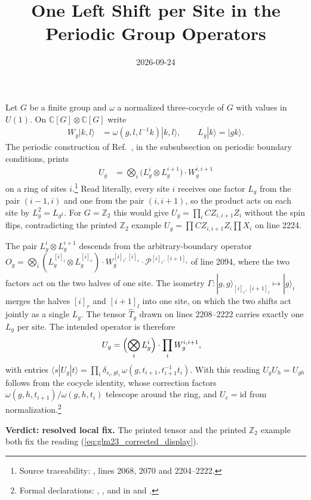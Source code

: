 \documentclass{article}
\title{One Left Shift per Site in the Periodic Group Operators}
\author{}
\date{2026-09-24}
\begin{document}
\maketitle
{}

Let $G$ be a finite group and $\omega$ a normalized three-cocycle of $G$
with values in $U(1)$. On $\mathbb{C}[G]\otimes\mathbb{C}[G]$ write
\begin{align}
    W_g|k,l\rangle
        &=\omega(g,l,l^{-1}k)|k,l\rangle,
    \qquad
    L_g|k\rangle=|gk\rangle .
    \label{eq:glm23_gate_shift}
\end{align}
The periodic construction of Ref.~\cite{GarreRubio2023MPOSym}, in the
subsubsection on periodic boundary conditions, prints
\begin{align}
    U_g
        &=\bigotimes_i \bigl(L_g^{i}\otimes L_g^{i+1}\bigr)\cdot W_g^{i,i+1}
    \label{eq:glm23_printed_display}
\end{align}
on a ring of sites $i$.\footnote{Source traceability:
, lines 2068, 2070 and
2204--2222.}
Read literally, every site $i$ receives one factor $L_g$ from the pair
$(i-1,i)$ and one from the pair $(i,i+1)$, so the product acts on each
site by $L_g^2=L_{g^2}$. For $G=\mathbb{Z}_2$ this would give
$U_g=\prod_i CZ_{i,i+1}Z_i$ without the spin flips, contradicting the
printed $\mathbb{Z}_2$ example $U_g=\prod CZ_{i,i+1}Z_i\prod X_i$ on
line 2224.

The pair $L_g^{i}\otimes L_g^{i+1}$ descends from the arbitrary-boundary
operator
$O_g=\bigotimes_i (L_g^{[i]_l}\otimes L_g^{[i]_r})\cdot
W_g^{[i]_l,[i]_r}\cdot\mathcal{P}^{[i]_r,[i+1]_l}$ of line 2094, where the
two factors act on the two halves of one site. The isometry
$\Gamma:|g,g\rangle_{[i]_r,[i+1]_l}\mapsto|g\rangle_i$ merges the halves
$[i]_r$ and $[i+1]_l$ into one site, on which the two shifts act jointly
as a single $L_g$. The tensor $\hat T_g$ drawn on lines 2208--2222 carries
exactly one $L_g$ per site. The intended operator is therefore
\begin{align}
    U_g
        &=\Bigl(\bigotimes_i L_g^{i}\Bigr)\cdot\prod_i W_g^{i,i+1},
    \label{eq:glm23_corrected_display}
\end{align}
with entries
$\langle s|U_g|t\rangle=\prod_i\delta_{s_i,gt_i}\,
\omega(g,t_{i+1},t_{i+1}^{-1}t_i)$.
With this reading $U_gU_h=U_{gh}$ follows from the cocycle identity, whose
correction factors
$\omega(g,h,t_{i+1})/\omega(g,h,t_i)$ telescope around the ring, and
$U_e=\mathrm{id}$ from normalization.\footnote{Formal declarations:
,
,
 and
 in
 and
.}

\textbf{Verdict: resolved local fix.}
The printed tensor and the printed $\mathbb{Z}_2$ example both fix the
reading (\ref{eq:glm23_corrected_display}).



\end{document}
